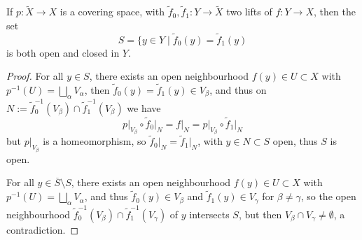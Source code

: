 \documentclass{article}
\begin{document}
\begin{lemma}
    If $p:\tilde{X}\rightarrow X$ is a covering space, with $\tilde{f}_0,\tilde{f}_1:Y\rightarrow \tilde{X}$ two lifts of $f:Y\rightarrow X$, then the set \[
    S = \{y\in Y \mid \tilde{f}_0(y) = \tilde{f}_1(y)
    \] is both open and closed in $Y$.
    \begin{proof}
        For all $y\in S$, there exists an open neighbourhood $f(y)\in U \subset X$ with $p^{-1}(U) = \bigsqcup_\alpha V_\alpha$, then $\tilde{f}_0(y) = \tilde{f}_1(y) \in V_\beta$, and thus on $N:=\tilde{f}_0^{-1}(V_\beta)\cap\tilde{f}_1^{-1}(V_\beta)$ we have \[
        p\vert_{V_\beta}\circ \tilde{f}_0\vert_N = f\vert_N = p\vert_{V_\beta}\circ \tilde{f}_1\vert_N
        \] but $p\vert_{V_\beta}$ is a homeomorphism, so $\tilde{f}_0\vert_N = \tilde{f}_1\vert_N$, with $y\in N\subset S$ open, thus $S$ is open.

        For all $y\in \overline{S}\setminus S$, there exists an open neighbourhood $f(y)\in U\subset X$ with $p^{-1}(U) = \bigsqcup_\alpha V_\alpha$, and thus $\tilde{f}_0(y)\in V_\beta$ and $\tilde{f}_1(y) \in V_\gamma$ for $\beta\neq\gamma$, so the open neighbourhood $\tilde{f}_0^{-1}(V_\beta)\cap\tilde{f}_1^{-1}(V_\gamma)$ of $y$ intersects $S$, but then $V_\beta\cap V_\gamma\neq \emptyset$, a contradiction.
    \end{proof}
\end{lemma}
\end{document}
